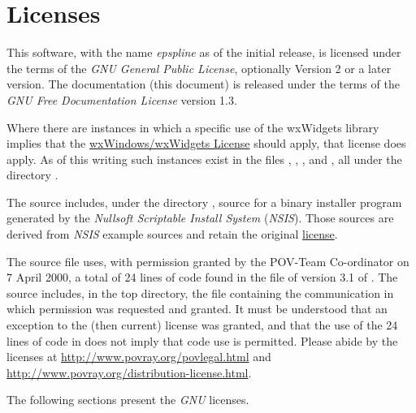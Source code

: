 \chapter{Licenses}%
\label{chap:licenses}

	This software, with the name \emph{epspline} as of the initial
	release, is licensed under the terms of the \emph{GNU
	General Public License}, optionally Version 2 or a later version.
	The \IXpkg{} documentation (this document) is released under
	the terms of the
	\emph{GNU Free Documentation License} version 1.3.

	Where there are instances in which a specific use of the
	wxWidgets library implies that the
	\href{http://www.wxwidgets.org/about/newlicen.htm}{wxWindows/wxWidgets License}
	should apply, that license does apply.
	As of this writing such instances exist in the files
	, ,
	, and ,
	all under the directory .

	The \IXpkg{} source includes, under the directory
	, source for a binary installer program
	generated by the
	\emph{Nullsoft Scriptable Install System} (\emph{NSIS}). Those
	sources are derived from \emph{NSIS} example sources and
	retain the original
	\href{http://nsis.sourceforge.net/License}{license}.
	
	The source file  uses,
	with permission granted
	by the POV-Team Co-ordinator on 7 April 2000,
	a total of 24 lines of code found in
	the file  of version 3.1 of \IXpov{}.
	The \IXpkg{} source includes, in the  top
	directory, the file
	 containing the communication
	in which permission was requested and granted. It must be
	understood that an exception to the (then current) license
	was granted, and that the use of the 24 lines of code in
	\IXpkg{} does not imply that \IXpov{} code use is
	permitted. Please abide by the \IXpov{} licenses at
	\url{http://www.povray.org/povlegal.html} and
	\url{http://www.povray.org/distribution-license.html}.

	The following sections present the \emph{GNU} licenses.

